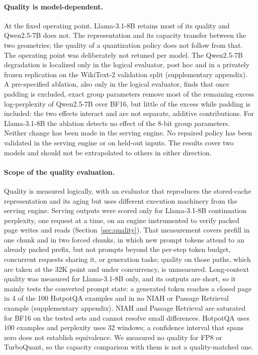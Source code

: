 \documentclass{article}
\begin{document}
\paragraph{Quality is model-dependent.}
At the fixed operating point, Llama-3.1-8B retains most of its quality and Qwen2.5-7B does not. The
representation and its capacity transfer between the two geometries; the quality of a quantization
policy does not follow from that. The operating point was deliberately not retuned per model. The
Qwen2.5-7B degradation is localized only in the logical evaluator, post hoc and in a privately frozen
replication on the WikiText-2 validation split (supplementary appendix). A pre-specified ablation, also
only in the logical evaluator, finds that once padding is excluded, exact group parameters remove most
of the remaining excess log-perplexity of Qwen2.5-7B over BF16, but little of the excess while padding
is included: the two effects interact and are not separate, additive contributions. For Llama-3.1-8B
the ablation detects no effect of the 8-bit group parameters. Neither change has been made in the
serving engine. No repaired policy has been
validated in the serving engine or on held-out inputs. The results cover two models
and should not be extrapolated to others in either direction.

\paragraph{Scope of the quality evaluation.}
Quality is measured logically, with an evaluator that reproduces the stored-cache representation and
its aging but uses different execution machinery from the serving engine. Serving outputs were scored
only for Llama-3.1-8B continuation perplexity, one request at a time, on an engine instrumented to
verify packed page writes and reads (Section~\ref{sec:quality}). That measurement covers prefill in one
chunk and in two forced chunks, in which new prompt tokens attend to an already packed prefix, but not
prompts beyond the per-step token budget, concurrent requests sharing it, or generation tasks; quality
on those paths, which are taken at the 32K point and under concurrency, is unmeasured. Long-context quality was measured
for Llama-3.1-8B only, and its outputs are short, so it mainly tests the converted prompt state: a
generated token reaches a closed page in 4 of the 100 HotpotQA examples and in no NIAH or Passage
Retrieval example (supplementary appendix). NIAH and Passage Retrieval are saturated for BF16 on the
tested sets and cannot resolve small differences. HotpotQA uses 100 examples and perplexity uses 32 windows; a confidence
interval that spans zero does not establish equivalence. We measured no quality for FP8 or TurboQuant,
so the capacity comparison with them is not a quality-matched one.
\end{document}
